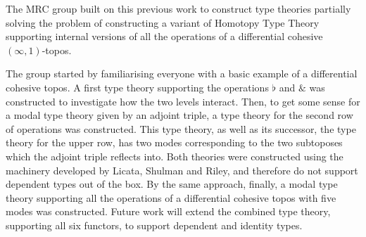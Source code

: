 \documentclass[a4paper,12pt]{article}
\newcommand{\Wat}{\&}
\begin{document}
The MRC group built on this previous work to construct type theories partially solving the problem of constructing a variant of Homotopy Type Theory
supporting internal versions of all the operations of a differential cohesive $(\infty,1)$-topos.

The group started by familiarising everyone with a basic example of a differential cohesive topos. 
A first type theory supporting the operations $\flat$ and $\Wat$ was constructed to investigate how the two levels interact.
Then, to get some sense for a modal type theory given by an adjoint triple, a type theory for the second row of operations was constructed.
This type theory, as well as its successor, the type theory for the upper row, has two modes corresponding to the two subtoposes which the adjoint triple reflects into. 
Both theories were constructed using the machinery developed by Licata, Shulman and Riley, and therefore do not support dependent types out of the box.
By the same approach, finally, a modal type theory supporting all the operations of a differential cohesive topos with five modes was constructed.
Future work will extend the combined type theory, supporting all six functors, to support dependent and identity types.
\end{document}
